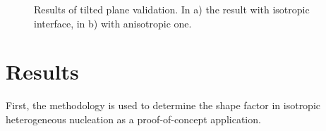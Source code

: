 	\begin{figure}
		\centering
		\caption{Results of tilted plane validation. In a) the result with isotropic interface, in b) with anisotropic one. }
		\label{fig_tilted_plane_validation_results}
	\end{figure}
		
\section{Results}
First, the methodology is used to determine the shape factor in isotropic heterogeneous nucleation as a proof-of-concept application.


